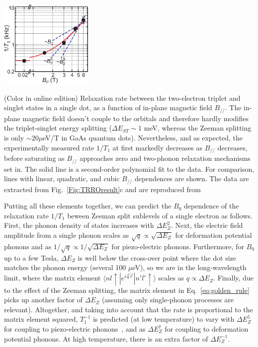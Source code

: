 \documentclass[12pt,aps,nofootinbib]{revtex4-1}
\begin{document}
\bfig
\begin{center}
\includegraphics[width=4.5cm]{hanson_fig22.eps}
\end{center}
\caption{(Color in online edition) Relaxation rate between the two-electron triplet and
singlet states in a single dot, as a function of in-plane magnetic
field $B_{//}$. The in-plane magnetic field doesn't couple to the orbitals and therefore hardly modifies the triplet-singlet energy splitting ($\Delta E_{ST} \sim 1$ meV, whereas the Zeeman splitting is only $\sim 20 \mu$eV/T in GaAs quantum dots). Nevertheless, and as expected, the experimentally measured rate $1/T_1$ at first markedly decreases as $B_{//}$ decreases, before saturating as $B_{//}$ approaches zero and two-phonon relaxation mechanisms set in. The solid line is a second-order polynomial fit to the data. For comparison, lines with linear, quadratic, and cubic $B_{//}$ dependences are shown. The data are extracted from Fig.~\ref{Fig:TRROresult}c and are reproduced from~\cite{HansonPRL2005}}
\label{fig:T1_vs_zeeman} 
\efig

Putting all these elements together, we can predict the $B_0$ dependence
of the relaxation rate $1/T_1$ beween Zeeman split sublevels of a
single electron as follows. First, the phonon density of states
increases with $\Delta E_{Z}^2$. Next, the electric field amplitude from
a single phonon scales as  $\sqrt{q}\propto\sqrt{\Delta E_Z}$ for
deformation potential phonons and as $1/\sqrt{q} \propto
1/\sqrt{\Delta E_Z}$ for piezo-electric phonons. Furthermore, for $B_0$
up to a few Tesla, $\Delta E_Z$ is well below the cross-over point
where the dot size matches the phonon energy (several 100
$\mu$eV), so we are in the long-wavelength limit, where the
matrix element $\langle n l \uparrow | e^{i\vec{q}\vec{r}} | n' l' \uparrow \rangle$ scales as $q\propto \Delta E_Z$.
Finally, due to the effect of the Zeeman splitting, the matrix
element in Eq.~\ref{eq:golden_rule} picks up another factor of
$\Delta E_Z$ (assuming only single-phonon processes are relevant). Altogether, and taking into account that the rate is proportional to the matrix element squared, $T_1^{-1}$ is predicted (at low temperature) to vary with $\Delta E_Z^5$ for coupling to piezo-electric phonons~\cite{khaetskii01}, and as $\Delta E_Z^7$ for coupling to deformation potential phonons. At high temperature, there is an extra factor of $\Delta E_Z^{-1}$.
\end{document}
